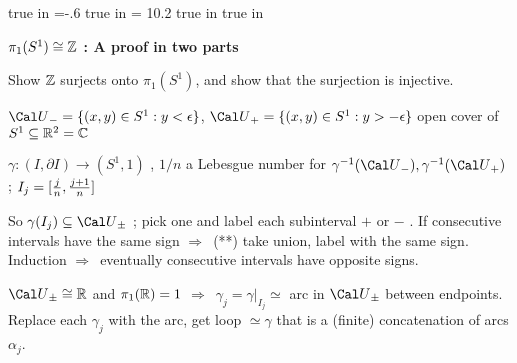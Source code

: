 
\overfullrule=0pt
\parindent=0pt

\nopagenumbers




 true in
\hoffset=-.6 true in
\hsize = 10.2 true in
 true in



\loadmsbm



\def\ctln{\centerline}
\def\u{\underbar}
\def\ssk{\smallskip}
\def\msk{\medskip}
\def\bsk{\bigskip}
\def\hsk{\hskip.1in}
\def\hhsk{\hskip.2in}
\def\dsl{\displaystyle}
\def\hskp{\hskip1.5in}

\def\lra{$\Leftrightarrow$ }
\def\ra{\rightarrow}
\def\mpto{\logmapsto}
\def\pu{\pi_1}
\def\mpu{$\pi_1$}
\def\sig{\Sigma}
\def\msig{$\Sigma$}
\def\ep{\epsilon}
\def\sset{\subseteq}
\def\del{\partial}
\def\inv{^{-1}}
\def\wtl{\widetilde}
\def\del{\partial}
\def\delp{\partial^\prime}
\def\delpp{\partial^{\prime\prime}}
\def\sgn{{\roman{sgn}}}
\def\wtih{\widetilde{H}}
\def\bbz{{\Bbb Z}}
\def\bbr{{\Bbb R}}
\def\rtar{$\Rightarrow$}

{\bf $\pi_1(S^1)\cong\bbz$ : A proof in two parts}

\msk

Show $\bbz$ surjects onto $\pi_1(S^1)$, and show that the 
surjection is injective.

\msk

${\Cal U}_- = \{(x,y)\in S^1 : y < \epsilon\}$, 
${\Cal U}_+ = \{(x,y)\in S^1 : y > -\epsilon\}$ open cover of $S^1\subseteq \bbr^2={\Bbb C}$

\ssk

$\gamma:(I,\del I)\ra (S^1,1)$ , $1/n$ a Lebesgue number for $\gamma^{-1}({\Cal U}_-),
\gamma^{-1}({\Cal U}_+)$ ; $I_j=[{{j}\over{n}},{{j+1}\over{n}}]$

\ssk

So $\gamma(I_j)\subseteq {\Cal U}_\pm$ ; pick one and label each subinterval $+$ or $-$ .
If consecutive intervals have the same sign \rtar\ (**) take union, label with the same
sign. Induction \rtar\ eventually consecutive intervals have opposite signs.

\ssk

${\Cal U}_\pm\cong\bbr$ and $\pi_1(\bbr)=1$ \rtar\ $\gamma_j=\gamma|_{I_j}\simeq$ arc in 
${\Cal U}_\pm$ between endpoints. Replace each $\gamma_j$ with the arc, get loop
$\simeq\gamma$ that is a (finite) concatenation of arcs $\alpha_j$.

